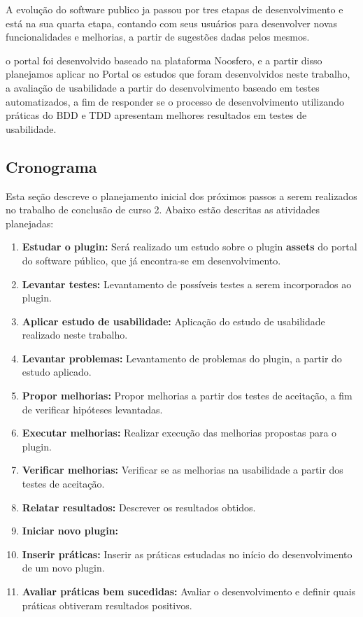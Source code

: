 A evolução do software publico ja passou por tres etapas de desenvolvimento e está na sua quarta etapa, contando com seus usuários para desenvolver novas funcionalidades e melhorias, a partir de sugestões dadas pelos mesmos.

o portal foi desenvolvido baseado na plataforma Noosfero, e a partir disso planejamos aplicar no Portal os estudos que foram desenvolvidos neste trabalho, a avaliação de usabilidade a partir do desenvolvimento baseado em testes automatizados, a fim de responder se o processo de desenvolvimento utilizando práticas do BDD e TDD apresentam melhores resultados em testes de usabilidade.

\subsection{Cronograma}

Esta seção descreve o planejamento inicial dos próximos passos a serem realizados no trabalho de conclusão de curso 2. Abaixo estão descritas as atividades planejadas:

\begin{enumerate}
\item \textbf{Estudar o plugin:} Será realizado um estudo sobre o plugin \textbf{assets} do portal do software público, que já encontra-se em desenvolvimento.
\item \textbf{Levantar testes:} Levantamento de possíveis testes a serem incorporados ao plugin.
\item \textbf{Aplicar estudo de usabilidade:} Aplicação do estudo de usabilidade realizado neste trabalho.
\item \textbf{Levantar problemas:} Levantamento de problemas do plugin, a partir do estudo aplicado.
\item  \textbf{Propor melhorias:} Propor melhorias a partir dos testes de aceitação, a fim de verificar hipóteses levantadas.
\item \textbf{Executar melhorias:} Realizar execução das melhorias propostas para o plugin.
\item \textbf{Verificar melhorias:} Verificar se as melhorias na usabilidade a partir dos testes de aceitação.
\item \textbf{Relatar resultados:} Descrever os resultados obtidos.
\item \textbf{Iniciar novo plugin:} 
\item \textbf{Inserir práticas:} Inserir as práticas estudadas no início do desenvolvimento de um novo plugin.
\item \textbf{Avaliar práticas bem sucedidas:} Avaliar o desenvolvimento e definir quais práticas obtiveram resultados positivos.

\end{enumerate}


